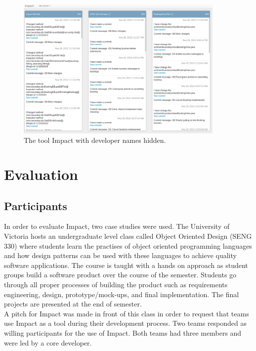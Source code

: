 \documentclass[conference]{IEEEtran}
\begin{document}
\begin{figure}[tb!]
\centering
\includegraphics[width=0.9\textwidth]{images/ImpactDemo}
\caption{The tool Impact with developer names hidden.\label{fig:impact}}
\end{figure}


\section{Evaluation}

\subsection{Participants}
In order to evaluate Impact, two case studies were used. The University of Victoria hosts an undergraduate
level class called Object Oriented Design (SENG 330) where students learn the practises of object oriented
programming languages and how design patterns can be used with these languages to achieve quality 
software applications. The course is taught with a hands on approach as student groups build a software
product over the course of the semester. Students go through all proper processes of building the product
such as requirements engineering, design, prototype/mock-ups, and final implementation. 
The final projects are presented at the end of semester. \\

A pitch for Impact was made in front of this class in order to request that teams use Impact as a tool during 
their development process. Two teams responded as willing participants for the use of Impact. Both teams 
had three members and were led by a core developer. \\
\end{document}
